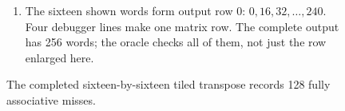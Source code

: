 \begin{figure}[htbp]
\begin{minipage}{\linewidth}
\begin{enumerate}
      \item The sixteen shown words form output row 0: $0,16,32,\ldots,240$. Four debugger lines make one matrix row. The complete output has 256 words; the oracle checks all of them, not just the row enlarged here.
    \end{enumerate}
  \end{minipage}
  \caption{The completed sixteen-by-sixteen tiled transpose records 128 fully associative misses.}
  \label{capture:011-matrix-transpose-f03-full}
  \label{transpose-f03-full}
\end{figure}
\par
